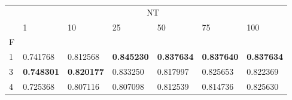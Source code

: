 \begin{table}[htbp]
\centering
\label{heart-results}
\begin{tabular}{lllllll}
\toprule
 & \multicolumn{6}{c}{NT} \\
 & 1 & 10 & 25 & 50 & 75 & 100 \\
F &  &  &  &  &  &  \\
\midrule
1 & 0.741768 & 0.812568 & \textbf{0.845230} & \textbf{0.837634} & \textbf{0.837640} & \textbf{0.837634} \\
3 & \textbf{0.748301} & \textbf{0.820177} & 0.833250 & 0.817997 & 0.825653 & 0.822369 \\
4 & 0.725368 & 0.807116 & 0.807098 & 0.812539 & 0.814736 & 0.825630 \\
\bottomrule
\end{tabular}
\end{table}
